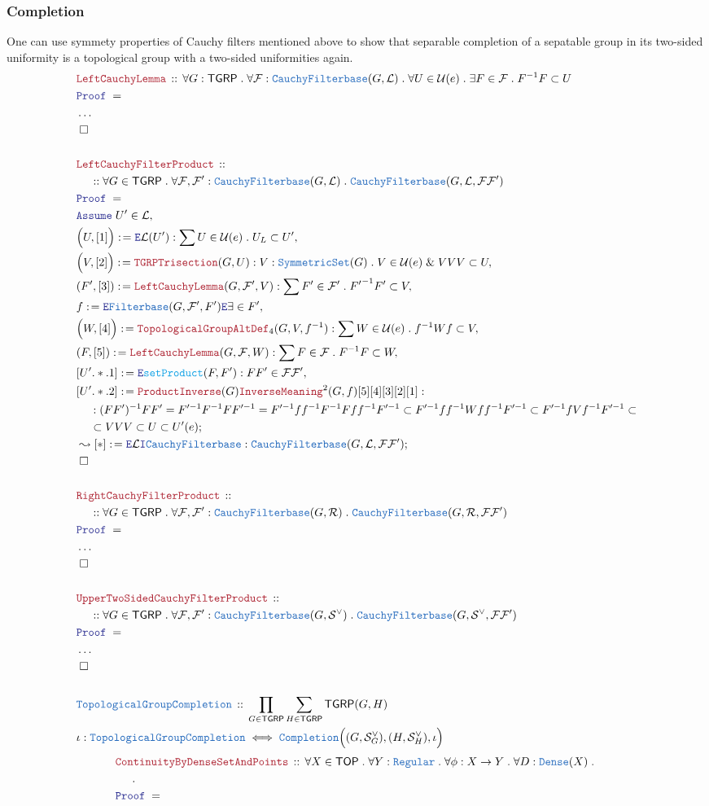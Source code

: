 \documentclass[12pt]{scrartcl}
\newcommand{\TYPE}[1]{\textcolor{NavyBlue}{\mathtt{#1}}}
\newcommand{\FUNC}[1]{\textcolor{Cerulean}{\mathtt{#1}}}
\newcommand{\LOGIC}[1]{\textcolor{Blue}{\mathtt{#1}}}
\newcommand{\THM}[1]{\textcolor{Maroon}{\mathtt{#1}}}
\renewcommand{\.}{\; . \;}
\newcommand{\de}{: \kern 0.1pc =}
\newcommand{\Theorem}[2]{& \THM{#1} \, :: \, #2 \\ & \Proof = \\ }
\newcommand{\DeclareType}[2]{& \TYPE{#1} \, :: \, #2 \\}
\newcommand{\DefineType}[3]{& #1 : \TYPE{#2} \iff #3 \\}
\newcommand{\NewLine}{\\ & \kern 1pc}
\newcommand{\Page}[1]{ \begin{align*} #1 \end{align*}   }
\newcommand{\NoProof}{ & \ldots \\ \EndProof}
\renewcommand{\And}{\; \& \;}
\newcommand{\Say}[3]{& #1 \de #2 : #3, \\}
\newcommand{\SayIn}[3]{& #1 \de #2 \in #3, \\}
\newcommand{\Conclude}[3]{& #1 \de #2 : #3; \\}
\newcommand{\DeriveConclude}[3]{& \leadsto #1 \de #2 : #3 ; \\}
\newcommand{\AssumeIn}[2]{& \LOGIC{Assume} \; #1 \in #2, \\}
\newcommand{\Intro}{\LOGIC{I}}
\newcommand{\Elim}{\LOGIC{E}}
\newcommand{\QED}{\; \square}
\newcommand{\EndProof}{& \QED \\}
\newcommand{\Proof}{\LOGIC{Proof} \; }
\newcommand{\R}{\mathrm{R}}
\newcommand{\Filterbase}{\TYPE{Filterbase}}
\newcommand{\Dense}{\TYPE{Dense}}
\newcommand{\TOP}{\mathsf{TOP}}
\renewcommand{\U}{\mathcal{U}}
\newcommand{\F}{\mathcal{F}}
\renewcommand{\L}{\mathcal{L}}
\renewcommand{\S}{\mathcal{S}}
\newcommand{\CF}{\TYPE{CauchyFilterbase}}
\newcommand{\Completion}{\TYPE{Completion}}
\renewcommand{\SS}{\TYPE{SymmetricSet}}
\newcommand{\TGRP}{\mathsf{TGRP}}
\renewcommand{\L}{\mathcal{L}}
\renewcommand{\R}{\mathcal{R}}
\renewcommand{\S}{\mathcal{S}}
\begin{document}
\subsubsection{Completion}
One can use symmety properties of Cauchy filters mentioned above to show that separable completion of a sepatable group in its two-sided uniformity is a topological group with a two-sided uniformities again.
\Page{
	\Theorem{LeftCauchyLemma}
	{
		\forall G : \TGRP \.
		\forall \F : \CF(G,\L) \.
		\forall U \in \U(e) \.
		\exists F \in \F \.
		F^{-1}F \subset U
	}
	\NoProof
	\\	
	\Theorem{LeftCauchyFilterProduct}
	{
		\NewLine ::	
		\forall G \in \TGRP \.
		\forall \F,\F' : \CF(G,\L) \.
		\CF(G,\L,\F\F')
	}
	\AssumeIn{U'}{\L}
	\Say{\Big(U,[1]\Big)}{\Elim \L(U')}
	{
		\sum U \in \U(e) \. U_L \subset U'
	}
	\Say{\Big(V,[2]\Big)}{\THM{TGRPTrisection}(G,U)}
	{
		V : \SS(G) \. V \in \U(e) \And VVV \subset U
	}
	\Say{(F',[3])}{\THM{LeftCauchyLemma}(G,\F',V)}
	{
		\sum F' \in \F' \.  {F'}^{-1}F' \subset V
	}
	\SayIn{f}{\Elim \Filterbase(G,\F',F')\Elim \exists}{F'}
	\Say{\Big(W,[4]\Big)}{\THM{TopologicalGroupAltDef}_4(G,V,f^{-1})}
	{
		\sum W \in \U(e) \. 
		f^{-1}Wf \subset V
	}
	\Say{(F,[5])}{\THM{LeftCauchyLemma}(G,\F,W)}
	{
		\sum F \in \F \.  F^{-1}F \subset W
	}
	\Say{[U'.*.1]}{\Elim \FUNC{setProduct}(F,F')}{FF' \in \F\F'}
	\Conclude{[U'.*.2]}{
		\THM{ProductInverse}(G)
		\THM{InverseMeaning}^2(G,f)
		[5]
		[4]
		[3]
		[2]
		[1]
	}
	{
		\NewLine :		
		(FF')^{-1}FF' = 
		{F}'^{-1}F^{-1}FF'^{-1}  =
		{F}'^{-1}ff^{-1}F^{-1}Fff^{-1}F'^{-1} \subset
		{F}'^{-1}ff^{-1}Wff^{-1}F'^{-1} \subset
		{F}'^{-1}f V  f^{-1}{F}'^{-1} \subset \NewLine \subset
		VVV \subset 
		U \subset 
		U'(e)
	}
	\DeriveConclude{[*]}{\Elim \L \Intro \CF}
	{
		\CF(G,\L,\F\F')
	}
	\EndProof
	\\
	\Theorem{RightCauchyFilterProduct}
	{
		\NewLine ::	
		\forall G \in \TGRP \.
		\forall \F,\F' : \CF(G,\R) \.
		\CF(G,\R,\F\F')
	}
	\NoProof
	\\
	\Theorem{UpperTwoSidedCauchyFilterProduct}
	{
		\NewLine ::	
		\forall G \in \TGRP \.
		\forall \F,\F' : \CF(G,\S^\vee) \.
		\CF(G,\S^\vee,\F\F')
	}
	\NoProof
	\\
	\DeclareType{TopologicalGroupCompletion}
	{
		\prod_{G \in \TGRP}
		\sum_{H \in \TGRP}
		\TGRP(G,H) 
	}
	\DefineType{\iota}{TopologicalGroupCompletion}
	{
		\Completion\Big((G,\S^\vee_G),(H,\S^\vee_H),\iota\Big)
	}
}\Page{
	\Theorem{ContinuityByDenseSetAndPoints}
	{
		\forall X \in \TOP \.
		\forall Y : \TYPE{Regular} \.
		\forall \phi : X \to Y \.
		\forall D : \Dense(X) \. \NewLine \.
}}
\end{document}
